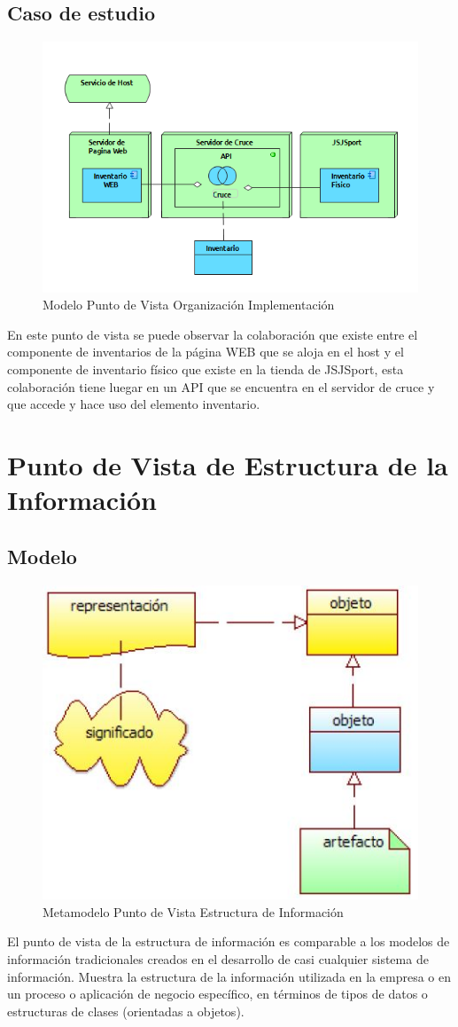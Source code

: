 \subsection{Caso de estudio}

\begin{figure}[th!]
	\centering
	\includegraphics[width=0.7\linewidth]{arquitectura/imagenes/PuntoVistaOrganizacionImplementacion}
	\caption{Modelo Punto de Vista Organización Implementación}
	\label{modeloOrganizacion}
\end{figure}

En este punto de vista se puede observar la colaboración que existe entre el componente de inventarios de la página WEB que se aloja en el host y el componente de inventario físico que existe en la tienda de JSJSport, esta colaboración tiene luegar en un API que se encuentra en el servidor de cruce y que accede y hace uso del elemento inventario.

\newpage

\section{Punto de Vista de Estructura de la Información}

\subsection{Modelo}

\begin{figure}[th!]
	\centering
	\includegraphics[width=0.5\linewidth]{arquitectura/imagenes/modeloEstructuraDeInformacion}
	\caption{Metamodelo Punto de Vista Estructura de Información}
	\label{metamodeloEstructuraInformacion}
\end{figure}
El punto de vista de la estructura de información es comparable a los modelos de información tradicionales creados en el desarrollo de casi cualquier sistema de información. Muestra la estructura de la información utilizada en la empresa o en un proceso o aplicación de negocio específico, en términos de tipos de datos o estructuras de clases (orientadas a objetos). 

